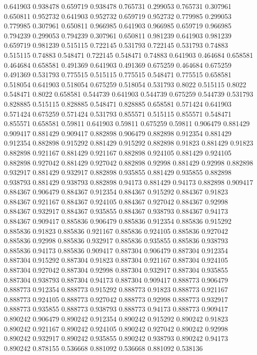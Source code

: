 0.641903 0.938478
0.659719 0.938478
0.765731 0.299053
0.765731 0.307961
0.650811 0.952732
0.641903 0.952732
0.659719 0.952732
0.779985 0.299053
0.779985 0.307961
0.650811 0.966985
0.641903 0.966985
0.659719 0.966985
0.794239 0.299053
0.794239 0.307961
0.650811 0.981239
0.641903 0.981239
0.659719 0.981239
0.515115 0.722145
0.531793 0.722145
0.531793 0.74883
0.515115 0.74883
0.548471 0.722145
0.548471 0.74883
0.641903 0.464684
0.658581 0.464684
0.658581 0.491369
0.641903 0.491369
0.675259 0.464684
0.675259 0.491369
0.531793 0.775515
0.515115 0.775515
0.548471 0.775515
0.658581 0.518054
0.641903 0.518054
0.675259 0.518054
0.531793 0.8022
0.515115 0.8022
0.548471 0.8022
0.658581 0.544739
0.641903 0.544739
0.675259 0.544739
0.531793 0.828885
0.515115 0.828885
0.548471 0.828885
0.658581 0.571424
0.641903 0.571424
0.675259 0.571424
0.531793 0.855571
0.515115 0.855571
0.548471 0.855571
0.658581 0.59811
0.641903 0.59811
0.675259 0.59811
0.906479 0.881429
0.909417 0.881429
0.909417 0.882898
0.906479 0.882898
0.912354 0.881429
0.912354 0.882898
0.915292 0.881429
0.915292 0.882898
0.91823 0.881429
0.91823 0.882898
0.921167 0.881429
0.921167 0.882898
0.924105 0.881429
0.924105 0.882898
0.927042 0.881429
0.927042 0.882898
0.92998 0.881429
0.92998 0.882898
0.932917 0.881429
0.932917 0.882898
0.935855 0.881429
0.935855 0.882898
0.938793 0.881429
0.938793 0.882898
0.94173 0.881429
0.94173 0.882898
0.909417 0.884367
0.906479 0.884367
0.912354 0.884367
0.915292 0.884367
0.91823 0.884367
0.921167 0.884367
0.924105 0.884367
0.927042 0.884367
0.92998 0.884367
0.932917 0.884367
0.935855 0.884367
0.938793 0.884367
0.94173 0.884367
0.909417 0.885836
0.906479 0.885836
0.912354 0.885836
0.915292 0.885836
0.91823 0.885836
0.921167 0.885836
0.924105 0.885836
0.927042 0.885836
0.92998 0.885836
0.932917 0.885836
0.935855 0.885836
0.938793 0.885836
0.94173 0.885836
0.909417 0.887304
0.906479 0.887304
0.912354 0.887304
0.915292 0.887304
0.91823 0.887304
0.921167 0.887304
0.924105 0.887304
0.927042 0.887304
0.92998 0.887304
0.932917 0.887304
0.935855 0.887304
0.938793 0.887304
0.94173 0.887304
0.909417 0.888773
0.906479 0.888773
0.912354 0.888773
0.915292 0.888773
0.91823 0.888773
0.921167 0.888773
0.924105 0.888773
0.927042 0.888773
0.92998 0.888773
0.932917 0.888773
0.935855 0.888773
0.938793 0.888773
0.94173 0.888773
0.909417 0.890242
0.906479 0.890242
0.912354 0.890242
0.915292 0.890242
0.91823 0.890242
0.921167 0.890242
0.924105 0.890242
0.927042 0.890242
0.92998 0.890242
0.932917 0.890242
0.935855 0.890242
0.938793 0.890242
0.94173 0.890242
0.878155 0.536668
0.881092 0.536668
0.881092 0.538136
